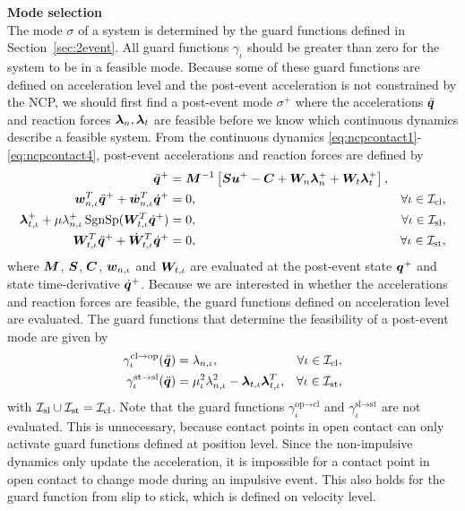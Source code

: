 \documentclass[../DC2017114Bouma.tex]{subfiles}
\begin{document}
\textbf{Mode selection}\\
The mode $\sigma$ of a system is determined by the guard functions defined in Section~\ref{sec:2event}. All guard functions $\gamma_\iota$ should be greater than zero for the system to be in a feasible mode. Because some of these guard functions are defined on acceleration level and the post-event acceleration is not constrained by the NCP, we should first find a post-event mode $\sigma^+$ where the accelerations $\ddot{{\boldsymbol{q}}}$ and reaction forces $\boldsymbol{\lambda}_{n},\boldsymbol{\lambda}_{t}$ are feasible before we know which continuous dynamics describe a feasible system. From the continuous dynamics \eqref{eq:ncpcontact1}-\eqref{eq:ncpcontact4}, post-event accelerations and reaction forces are defined by
\begin{align}
\ddot{{\boldsymbol{q}}}^+ &= {\boldsymbol{M}}^{-1}\left[{\boldsymbol{S}}{\boldsymbol{u}}^+ - {\boldsymbol{C}} + {\boldsymbol{W}}_{n}\boldsymbol{\lambda}^+_{n} + {\boldsymbol{W}}_{t}\boldsymbol{\lambda}^+_{t}\right], &  \label{eq:2nonimp1}\\
{\boldsymbol{w}}^T_{n,\iota}\ddot{{\boldsymbol{q}}}^+ + \dot{{\boldsymbol{w}}}^T_{n,\iota}\dot{{\boldsymbol{q}}}^+ &= 0, & \forall \iota\in\mathcal{I}_{\text{cl}},\label{eq:2nonimp2}\\
\boldsymbol{\lambda}^+_{t,\iota} + \mu\lambda^+_{n,\iota}\operatorname{\text{SgnSp}}({\boldsymbol{W}}_{t,\iota}^T\dot{{\boldsymbol{q}}}^+) &= 0, & \forall \iota\in\mathcal{I}_{\text{sl}},\label{eq:2nonimp3}\\
{\boldsymbol{W}}^T_{t,\iota}\ddot{{\boldsymbol{q}}}^+ + \dot{{\boldsymbol{W}}}^T_{t,\iota}\dot{{\boldsymbol{q}}}^+ &= 0, & \forall \iota\in\mathcal{I}_{\text{st}},\label{eq:2nonimp4}
\end{align}
where ${\boldsymbol{M}}$, ${\boldsymbol{S}}$, ${\boldsymbol{C}}$, ${\boldsymbol{w}}_{n,\iota}$ and ${\boldsymbol{W}}_{t,\iota}$ are evaluated at the post-event state ${\boldsymbol{q}}^+$ and state time-derivative $\dot{{\boldsymbol{q}}}^+$. Because we are interested in whether the accelerations and reaction forces are feasible, the guard functions defined on acceleration level are evaluated. The guard functions that determine the feasibility of a post-event mode are given by
\begin{align}
\gamma^{\text{cl}\rightarrow\text{op}}_{\iota}(\ddot{{\boldsymbol{q}}}) &= \lambda_{n,\iota}, & \forall \iota\in\mathcal{I}_{\text{cl}},\\
\gamma^{\text{st}\rightarrow\text{sl}}_{\iota}(\ddot{{\boldsymbol{q}}}) &= \mu_{\iota}^2\lambda_{n,\iota}^2 - \boldsymbol{\lambda}_{t,\iota}\boldsymbol{\lambda}_{t,\iota}^T, & \forall \iota\in\mathcal{I}_{\text{st}},
\end{align}
with $\mathcal{I}_{\text{sl}}\cup\mathcal{I}_{\text{st}}=\mathcal{I}_{\text{cl}}$. Note that the guard functions $\gamma_{\iota}^{\text{op}\rightarrow\text{cl}}$ and $\gamma_{\iota}^{\text{sl}\rightarrow\text{st}}$ are not evaluated. This is unnecessary, because contact points in open contact can only activate guard functions defined at position level. Since the non-impulsive dynamics only update the acceleration, it is impossible for a contact point in open contact to change mode during an impulsive event. This also holds for the guard function from slip to stick, which is defined on velocity level.
\end{document}
